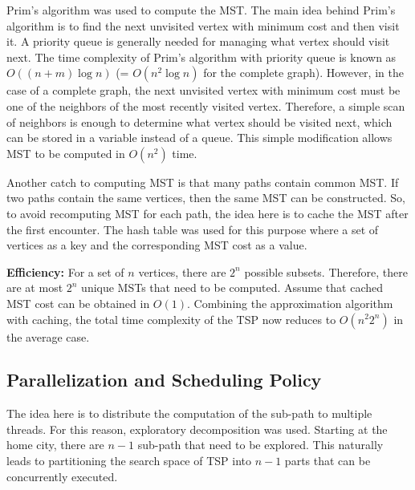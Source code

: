 \documentclass[conference]{IEEEtran}
\begin{document}
Prim's algorithm was used to compute the MST. The main idea behind Prim's algorithm is to find the next unvisited vertex with minimum cost and then visit it. A priority queue is generally needed for managing what vertex should visit next. The time complexity of Prim's algorithm with priority queue is known as $O((n+m)\log n)$ (= $O(n^2 \log n)$ for the complete graph). However, in the case of a complete graph, the next unvisited vertex with minimum cost must be one of the neighbors of the most recently visited vertex. Therefore, a simple scan of neighbors is enough to determine what vertex should be visited next, which can be stored in a variable instead of a queue. This simple modification allows MST to be computed in $O(n^2)$ time. 

Another catch to computing MST is that many paths contain common MST. If two paths contain the same vertices, then the same MST can be constructed. So, to avoid recomputing MST for each path, the idea here is to cache the MST after the first encounter. The hash table was used for this purpose where a set of vertices as a key and the corresponding MST cost as a value. 

\textbf{Efficiency:} 
For a set of $n$ vertices, there are $2^n$ possible subsets. Therefore, there are at most $2^n$ unique MSTs that need to be computed. Assume that cached MST cost can be obtained in $O(1)$. Combining the approximation algorithm with caching, the total time complexity of the TSP now reduces to $O(n^2 2^n)$ in the average case.


\subsection{Parallelization and Scheduling Policy}
The idea here is to distribute the computation of the sub-path to multiple threads. For this reason, exploratory decomposition was used. Starting at the home city, there are $n-1$ sub-path that need to be explored. This naturally leads to partitioning the search space of TSP into $n-1$ parts that can be concurrently executed.
\end{document}
